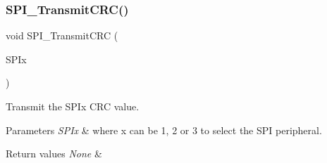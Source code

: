 \subsubsection{\texorpdfstring{SPI\_TransmitCRC()}{SPI\_TransmitCRC()}}
{\footnotesize\ttfamily void S\+P\+I\+\_\+\+Transmit\+C\+RC (\begin{DoxyParamCaption}\item[{\mbox{\hyperlink{struct_s_p_i___type_def}{S\+P\+I\+\_\+\+Type\+Def}} $\ast$}]{S\+P\+Ix }\end{DoxyParamCaption})}



Transmit the S\+P\+Ix C\+RC value. 


\begin{DoxyParams}{Parameters}
{\em S\+P\+Ix} & where x can be 1, 2 or 3 to select the S\+PI peripheral. \\
\hline
\end{DoxyParams}

\begin{DoxyRetVals}{Return values}
{\em None} & \\
\hline
\end{DoxyRetVals}
